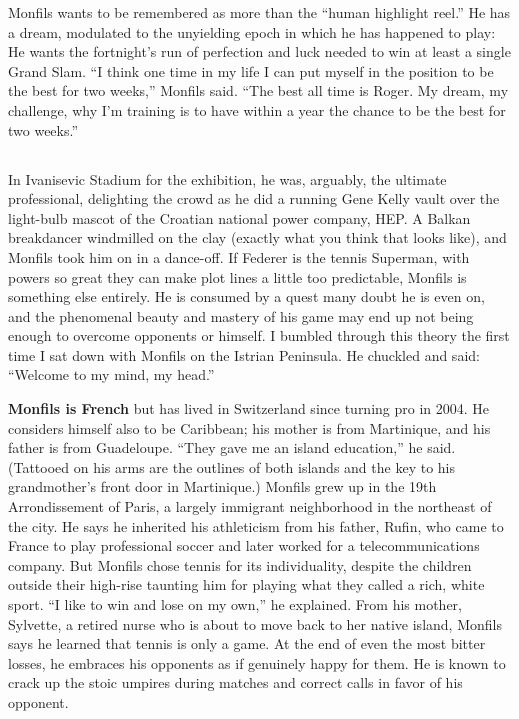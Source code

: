 Monfils wants to be remembered as more than the ``human highlight
reel.'' He has a dream, modulated to the unyielding epoch in which he
has happened to play: He wants the fortnight's run of perfection and
luck needed to win at least a single Grand Slam. ``I think one time in
my life I can put myself in the position to be the best for two weeks,''
Monfils said. ``The best all time is Roger. My dream, my challenge, why
I'm training is to have within a year the chance to be the best for two
weeks.''

\subsection{}

In Ivanisevic Stadium for the exhibition, he was, arguably, the ultimate
professional, delighting the crowd as he did a running Gene Kelly vault
over the light-bulb mascot of the Croatian national power company, HEP.
A Balkan breakdancer windmilled on the clay (exactly what you think that
looks like), and Monfils took him on in a dance-off. If Federer is the
tennis Superman, with powers so great they can make plot lines a little
too predictable, Monfils is something else entirely. He is consumed by a
quest many doubt he is even on, and the phenomenal beauty and mastery of
his game may end up not being enough to overcome opponents or himself. I
bumbled through this theory the first time I sat down with Monfils on
the Istrian Peninsula. He chuckled and said: ``Welcome to my mind, my
head.''

\textbf{Monfils is French} but has lived in Switzerland since turning
pro in 2004. He considers himself also to be Caribbean; his mother is
from Martinique, and his father is from Guadeloupe. ``They gave me an
island education,'' he said. (Tattooed on his arms are the outlines of
both islands and the key to his grandmother's front door in Martinique.)
Monfils grew up in the 19th Arrondissement of Paris, a largely immigrant
neighborhood in the northeast of the city. He says he inherited his
athleticism from his father, Rufin, who came to France to play
professional soccer and later worked for a telecommunications company.
But Monfils chose tennis for its individuality, despite the children
outside their high-rise taunting him for playing what they called a
rich, white sport. ``I like to win and lose on my own,'' he explained.
From his mother, Sylvette, a retired nurse who is about to move back to
her native island, Monfils says he learned that tennis is only a game.
At the end of even the most bitter losses, he embraces his opponents as
if genuinely happy for them. He is known to crack up the stoic umpires
during matches and correct calls in favor of his opponent.

